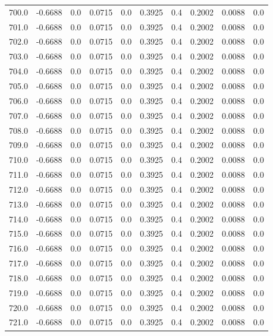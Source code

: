 \begin{longtable}{lrrrrrrrrr}
700.0 & -0.6688 & 0.0 & 0.0715 & 0.0 & 0.3925 & 0.4 & 0.2002 & 0.0088 & 0.0 \\
701.0 & -0.6688 & 0.0 & 0.0715 & 0.0 & 0.3925 & 0.4 & 0.2002 & 0.0088 & 0.0 \\
702.0 & -0.6688 & 0.0 & 0.0715 & 0.0 & 0.3925 & 0.4 & 0.2002 & 0.0088 & 0.0 \\
703.0 & -0.6688 & 0.0 & 0.0715 & 0.0 & 0.3925 & 0.4 & 0.2002 & 0.0088 & 0.0 \\
704.0 & -0.6688 & 0.0 & 0.0715 & 0.0 & 0.3925 & 0.4 & 0.2002 & 0.0088 & 0.0 \\
705.0 & -0.6688 & 0.0 & 0.0715 & 0.0 & 0.3925 & 0.4 & 0.2002 & 0.0088 & 0.0 \\
706.0 & -0.6688 & 0.0 & 0.0715 & 0.0 & 0.3925 & 0.4 & 0.2002 & 0.0088 & 0.0 \\
707.0 & -0.6688 & 0.0 & 0.0715 & 0.0 & 0.3925 & 0.4 & 0.2002 & 0.0088 & 0.0 \\
708.0 & -0.6688 & 0.0 & 0.0715 & 0.0 & 0.3925 & 0.4 & 0.2002 & 0.0088 & 0.0 \\
709.0 & -0.6688 & 0.0 & 0.0715 & 0.0 & 0.3925 & 0.4 & 0.2002 & 0.0088 & 0.0 \\
710.0 & -0.6688 & 0.0 & 0.0715 & 0.0 & 0.3925 & 0.4 & 0.2002 & 0.0088 & 0.0 \\
711.0 & -0.6688 & 0.0 & 0.0715 & 0.0 & 0.3925 & 0.4 & 0.2002 & 0.0088 & 0.0 \\
712.0 & -0.6688 & 0.0 & 0.0715 & 0.0 & 0.3925 & 0.4 & 0.2002 & 0.0088 & 0.0 \\
713.0 & -0.6688 & 0.0 & 0.0715 & 0.0 & 0.3925 & 0.4 & 0.2002 & 0.0088 & 0.0 \\
714.0 & -0.6688 & 0.0 & 0.0715 & 0.0 & 0.3925 & 0.4 & 0.2002 & 0.0088 & 0.0 \\
715.0 & -0.6688 & 0.0 & 0.0715 & 0.0 & 0.3925 & 0.4 & 0.2002 & 0.0088 & 0.0 \\
716.0 & -0.6688 & 0.0 & 0.0715 & 0.0 & 0.3925 & 0.4 & 0.2002 & 0.0088 & 0.0 \\
717.0 & -0.6688 & 0.0 & 0.0715 & 0.0 & 0.3925 & 0.4 & 0.2002 & 0.0088 & 0.0 \\
718.0 & -0.6688 & 0.0 & 0.0715 & 0.0 & 0.3925 & 0.4 & 0.2002 & 0.0088 & 0.0 \\
719.0 & -0.6688 & 0.0 & 0.0715 & 0.0 & 0.3925 & 0.4 & 0.2002 & 0.0088 & 0.0 \\
720.0 & -0.6688 & 0.0 & 0.0715 & 0.0 & 0.3925 & 0.4 & 0.2002 & 0.0088 & 0.0 \\
721.0 & -0.6688 & 0.0 & 0.0715 & 0.0 & 0.3925 & 0.4 & 0.2002 & 0.0088 & 0.0 \\

\end{longtable}
